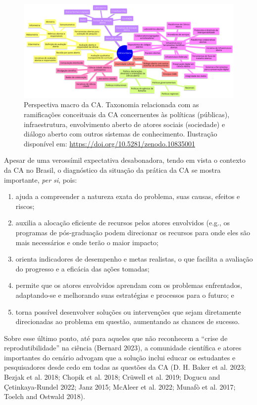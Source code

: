 \documentclass[
  a4paper,
]{article}
\begin{document}
\begin{figure}

\includegraphics{img/ca-macro.png}

\caption{\label{fig-ca-macro}Perspectiva macro da CA. Taxonomia
relacionada com as ramificações conceituais da CA concernentes às
políticas (públicas), infraestrutura, envolvimento aberto de atores
sociais (sociedade) e diálogo aberto com outros sistemas de
conhecimento. Ilustração disponível em:
\url{https://doi.org/10.5281/zenodo.10835001}}

\end{figure}%

Apesar de uma verossímil expectativa desabonadora, tendo em vista o
contexto da CA no Brasil, o diagnóstico da situação da prática da CA se
mostra importante, \emph{per si}, pois:

\begin{enumerate}
\def\labelenumi{\arabic{enumi}.}
\item
  ajuda a compreender a natureza exata do problema, suas causas, efeitos
  e riscos;
\item
  auxilia a alocação eficiente de recursos pelos atores envolvidos
  (e.g., os programas de pós-graduação podem direcionar os recursos para
  onde eles são mais necessários e onde terão o maior impacto;
\item
  orienta indicadores de desempenho e metas realistas, o que facilita a
  avaliação do progresso e a eficácia das ações tomadas;
\item
  permite que os atores envolvidos aprendam com os problemas
  enfrentados, adaptando-se e melhorando suas estratégias e processos
  para o futuro; e
\item
  torna possível desenvolver soluções ou intervenções que sejam
  diretamente direcionadas ao problema em questão, aumentando as chances
  de sucesso.
\end{enumerate}

Sobre esse último ponto, até para aqueles que não reconhecem a ``crise
de reprodutibilidade'' na ciência (Bernard 2023), a comunidade
científica e atores importantes do cenário advogam que a solução inclui
educar os estudantes e pesquisadores desde cedo em todas as questões da
CA (D. H. Baker et al. 2023; Bezjak et al. 2018; Chopik et al. 2018;
Crüwell et al. 2019; Dogucu and Çetinkaya-Rundel 2022; Janz 2015;
McAleer et al. 2022; Munafò et al. 2017; Toelch and Ostwald 2018).
\end{document}
